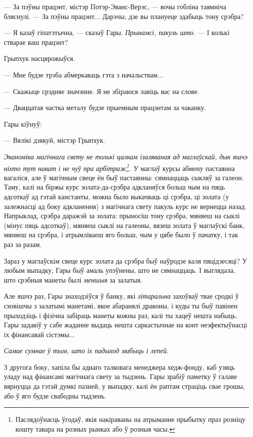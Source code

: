 --- За пэўны працэнт, містэр Потэр-Эванс-Верэс, --- вочы гобліна таямніча бляснулі. --- За пэўны
працэнт... Дарэчы, дзе вы плануеце здабыць тону срэбра?

--- Я казаў гіпатэтычна, --- сказаў Гары. \emph{Прынамсі, пакуль што.} --- І колькі стварае ваш
працэнт?

Грыпхук насцярожыўся.

--- Мне будзе трэба абмеркаваць гэта з начальствам...

--- Скажыце срэдняе значэнне. Я не збіраюся лавіць вас на слове.

--- Дваццатая частка металу будзе прыемным працэнтам за чаканку.

Гары кіўнуў:

--- Вялікі дзякуй, містэр Грыпхук.

\emph{Эканоміка магічнага свету не толькі цалкам ізаляваная ад маглаўскай, дык яшчэ ніхто тут 
нават і 
не чуў пра арбітраж\footnote{{}Паслядоўнасць ўгодаў, якія накіраваны на атрыманне прыбытку праз
розніцу кошту тавара на розных рынках або ў розныя часы.}.} У маглаў курсы абмену пастаянна
вагаліся, але ў магічным свеце ён быў пастаянны: сямнаццаць сыкляў за галеон.
Таму, калі на біржы курс золата-да-срэбра адкланяўся больш чым на пяць адсоткаў
ад гэтай канстанты, можна было выкачваць ці срэбра, ці золата
(у залежнасці ад боку адкланення) з магічнага свету пакуль курс не вернецца назад. 
Напрыклад, срэбра даражэй за золата: прыносіш тону 
срэбра, мяняеш на сыклі (мінус пяць адсоткаў), мяняеш сыклі на галеоны, вязеш золата ў 
маглаўскі банк, мяняеш на срэбра, і атрымліваеш яго больш, чым у цябе было ў пачатку, і
так раз за разам.

Зараз у маглаўскім свеце курс золата да срэбра быў наўродзе каля пяцідзесяці? У любым выпадку, Гары 
быў амаль упэўнены, што не сямнаццаць. І выглядала, што срэбныя манеты былі \emph{меншыя} 
за залатыя.

Але яшчэ раз, Гары знаходзіўся ў банку, які \emph{літаральна} захоўваў твае сродкі ў сховішчы з
залатымі манетамі, якое абаранялі драконы, і куды ты быў павінен прыходзіць і фізічна забіраць 
манеты кожны раз, калі ты хацеў нешта набыць. Гары задавіў у сабе жаданне 
выдаць нешта саркастычнае на конт неэфектыўнасці іх фінансавай  сістэмы...

\emph{Самае сумнае ў тым, што іх падыход мабыць і лепей.}

З другога боку, хапіла бы аднаго талковага менеджера хедж-фонду, каб узяць уладу над фінансамі 
магічнага свету за тыдзень. Гары зрабіў паметку ў галаве вярнуцца да гэтай думкі пазней, у 
выпадку, калі ён раптам страціць свае грошы, або ў яго будзе свабодны тыдзень. 

